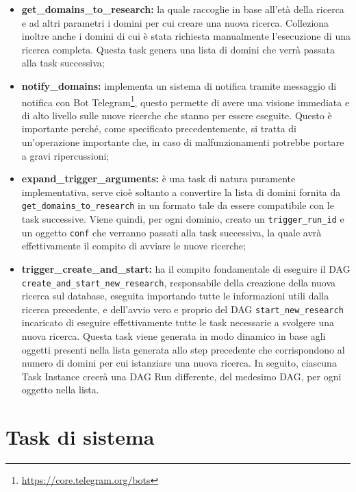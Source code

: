 \begin{itemize}
  \item \textbf{get\_domains\_to\_research:} la quale raccoglie in base all'età
    della ricerca e ad altri parametri i domini per cui creare una nuova ricerca.
    Colleziona inoltre anche i domini di cui è stata richiesta manualmente l'esecuzione
    di una ricerca completa. Questa task genera una lista di domini che verrà
    passata alla task successiva;

  \item \textbf{notify\_domains:} implementa un sistema di notifica tramite
    messaggio di notifica con Bot Telegram\footnote{\url{https://core.telegram.org/bots}},
    questo permette di avere una visione immediata e di alto livello sulle nuove
    ricerche che stanno per essere eseguite. Questo è importante perché, come
    specificato precedentemente, si tratta di un'operazione importante che, in
    caso di malfunzionamenti potrebbe portare a gravi ripercussioni;

  \item \textbf{expand\_trigger\_arguments:} è una task di natura puramente
    implementativa, serve cioè soltanto a convertire la lista di domini fornita da
    \texttt{get\_domains\_to\_research} in un formato tale da essere compatibile
    con le task successive. Viene quindi, per ogni dominio, creato un \texttt{trigger\_run\_id}
    e un oggetto \texttt{conf} che verranno passati alla task successiva, la
    quale avrà effettivamente il compito di avviare le nuove ricerche;

  \item \textbf{trigger\_create\_and\_start:} ha il compito fondamentale di
    eseguire il DAG \texttt{create\_and\_start\_new\_research}, responsabile
    della creazione della nuova ricerca sul database, eseguita importando tutte le
    informazioni utili dalla ricerca precedente, e dell'avvio vero e proprio del
    DAG \texttt{start\_new\_research} incaricato di eseguire effettivamente tutte
    le task necessarie a svolgere una nuova ricerca. Questa task viene generata
    in modo dinamico in base agli oggetti presenti nella lista generata allo
    step precedente che corrispondono al numero di domini per cui istanziare una
    nuova ricerca. In seguito, ciascuna Task Instance creerà una DAG Run
    differente, del medesimo DAG, per ogni oggetto nella lista.
\end{itemize}

\section{Task di sistema}
\label{sec:sistema}

